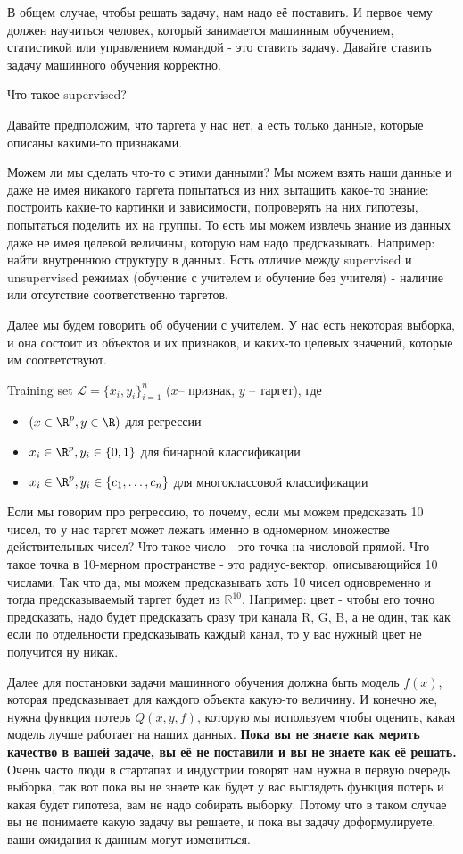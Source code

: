 В общем случае, чтобы решать задачу, нам надо её поставить. И первое чему должен научиться человек, который занимается машинным обучением, статистикой или управлением командой - это ставить задачу. Давайте ставить задачу машинного обучения корректно.


Что такое supervised?

Давайте предположим, что таргета у нас нет, а есть только данные, которые описаны какими-то признаками.

Можем ли мы сделать что-то с этими данными? Мы можем взять наши данные и даже не имея никакого таргета попытаться из них вытащить какое-то знание: построить какие-то картинки и зависимости, попроверять на
них гипотезы, попытаться поделить их на группы. То есть мы можем извлечь знание из данных даже не имея
целевой величины, которую нам надо предсказывать. Например: найти внутреннюю структуру в данных. Есть
отличие между supervised и unsupervised режимах (обучение с учителем и обучение без учителя) - наличие
или отсутствие соответственно таргетов.


Далее мы будем говорить об обучении с учителем. У нас есть некоторая выборка, и она состоит из объектов
и их признаков, и каких-то целевых значений, которые им соответствуют.

\Def Training set $\mathcal{L} = \{ x_i, y_i \}_{i=1}^{n}$ ($x$-- признак, $y$ -- таргет), где

\begin{itemize}
    \item $(x \in \R^p, y \in \R)$ для регрессии
    \item $x_i \in \R^p, y_i \in \{ 0, 1 \}$ для бинарной классификации
    \item $x_i \in \R^p, y_i \in \{ c_1, \ldots, c_n \}$ для многоклассовой классификации
\end{itemize}

Если мы говорим про регрессию, то  почему, если мы можем предсказать 10 чисел, то у нас таргет может лежать именно в одномерном множестве действительных чисел? Что такое число - это точка на числовой прямой. Что такое точка в 10-мерном
пространстве - это радиус-вектор, описывающийся 10 числами. Так что да, мы можем предсказывать хоть 10
чисел одновременно и тогда предсказываемый таргет будет из $\mathbb{R}^{10}$. Например: цвет - чтобы его точно предсказать, надо будет предсказать сразу три канала R, G, B, а не один, так как если по отдельности предсказывать
каждый канал, то у вас нужный цвет не получится ну никак.


Далее для постановки задачи машинного обучения должна быть модель $f(x)$, которая предсказывает для
каждого объекта какую-то величину. И конечно же, нужна функция потерь $Q(x, y, f)$, которую мы используем
чтобы оценить, какая модель лучше работает на наших данных. \textbf{Пока вы не знаете как мерить качество в вашей
задаче, вы её не поставили и вы не знаете как её решать.} Очень часто люди в стартапах и индустрии говорят
нам нужна в первую очередь выборка, так вот пока вы не знаете как будет у вас выглядеть функция потерь и какая будет гипотеза, вам не надо собирать выборку. Потому что в таком случае вы не понимаете какую
задачу вы решаете, и пока вы задачу доформулируете, ваши ожидания к данным могут измениться.

